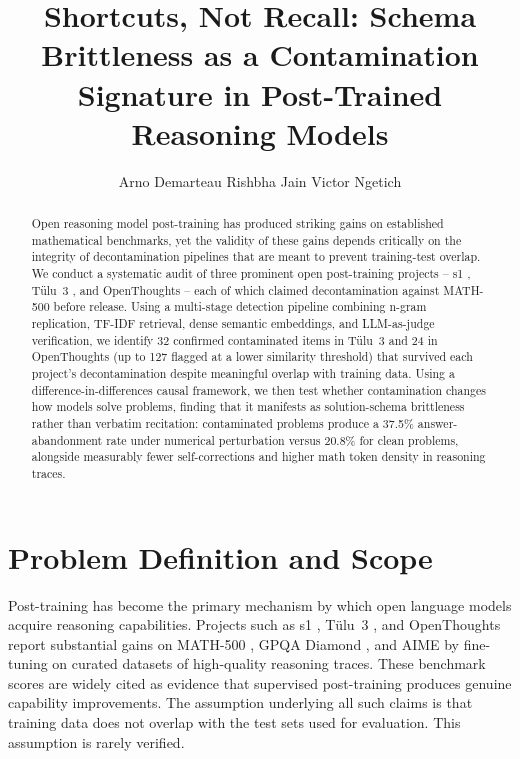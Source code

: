 \documentclass{article} %
\title{Shortcuts, Not Recall: Schema Brittleness as a Contamination Signature in Post-Trained Reasoning Models}
\author{Arno Demarteau \quad Rishbha Jain \quad Victor Ngetich}
\begin{document}
\maketitle
\thispagestyle{empty}
\pagestyle{plain}

\begin{abstract}
Open reasoning model post-training has produced striking gains on established mathematical benchmarks, yet the validity of these gains depends critically on the integrity of decontamination pipelines that are meant to prevent training-test overlap. We conduct a systematic audit of three prominent open post-training projects -- s1 \citep{muennighoff2025s1}, T\"ulu~3 \citep{lambert2025tulu3}, and OpenThoughts \citep{openthoughts2025} -- each of which claimed decontamination against MATH-500 \citep{hendrycks2021math} before release. Using a multi-stage detection pipeline combining n-gram replication, TF-IDF retrieval, dense semantic embeddings, and LLM-as-judge verification, we identify 32 confirmed contaminated items in T\"ulu~3 and 24 in OpenThoughts (up to 127 flagged at a lower similarity threshold) that survived each project's decontamination despite meaningful overlap with training data. Using a difference-in-differences causal framework, we then test whether contamination changes how models solve problems, finding that it manifests as solution-schema brittleness rather than verbatim recitation: contaminated problems produce a 37.5\% answer-abandonment rate under numerical perturbation versus 20.8\% for clean problems, alongside measurably fewer self-corrections and higher math token density in reasoning traces.
\end{abstract}

\section{Problem Definition and Scope}

Post-training has become the primary mechanism by which open language models acquire reasoning capabilities. Projects such as s1 \citep{muennighoff2025s1}, T\"ulu~3 \citep{lambert2025tulu3}, and OpenThoughts \citep{openthoughts2025} report substantial gains on MATH-500 \citep{hendrycks2021math}, GPQA Diamond \citep{rein2023gpqa}, and AIME by fine-tuning on curated datasets of high-quality reasoning traces. These benchmark scores are widely cited as evidence that supervised post-training produces genuine capability improvements. The assumption underlying all such claims is that training data does not overlap with the test sets used for evaluation. This assumption is rarely verified.
\end{document}
